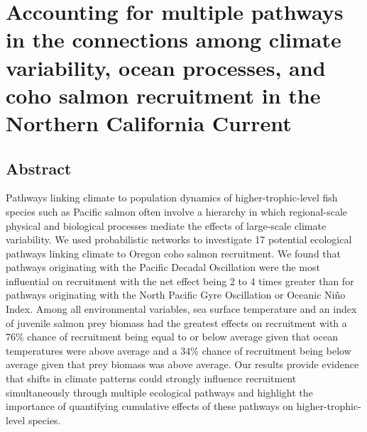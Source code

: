 
\chapter[Quantifying ecological network effects]{Accounting for multiple
pathways in the connections among climate variability, ocean processes, and coho
salmon recruitment in the Northern California Current\footnotemark[1]}



\section{Abstract}

Pathways linking climate to population dynamics of higher-trophic-level fish
species such as Pacific salmon often involve a hierarchy in which regional-scale
physical and biological processes mediate the effects of large-scale climate
variability. We used probabilistic networks to investigate 17 potential
ecological pathways linking climate to Oregon coho salmon recruitment. We found
that pathways originating with the Pacific Decadal Oscillation were the most
influential on recruitment with the net effect being 2 to 4 times greater than
for pathways originating with the North Pacific Gyre Oscillation or Oceanic
Ni\~{n}o Index. Among all environmental variables, sea surface temperature and
an index of juvenile salmon prey biomass had the greatest effects on recruitment
with a 76\% chance of recruitment being equal to or below average given that
ocean temperatures were above average and a 34\% chance of recruitment being
below average given that prey biomass was above average. Our results provide
evidence that shifts in climate patterns could strongly influence recruitment
simultaneously through multiple ecological pathways and highlight the importance
of quantifying cumulative effects of these pathways on higher-trophic-level
species.



